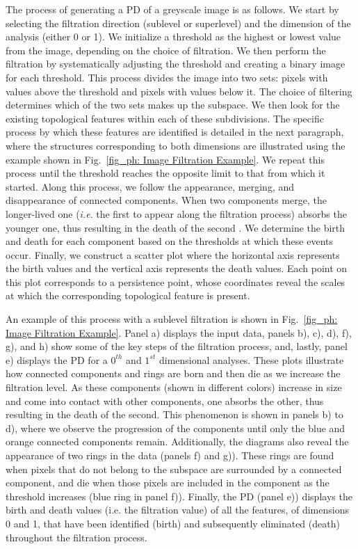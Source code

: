 \documentclass[12pt]{mythesis}
\begin{document}
The process of generating a PD of a greyscale image is as follows. We start by selecting the filtration direction (sublevel or superlevel) and the dimension of the analysis (either 0 or 1). We initialize a threshold as the highest or lowest value from the image, depending on the choice of filtration. We then perform the filtration by systematically adjusting the threshold and creating a binary image for each threshold. This process divides the image into two sets: pixels with values above the threshold and pixels with values below it. The choice of filtering determines which of the two sets makes up the subspace. We then look for the existing topological features within each of these subdivisions. The specific process by which these features are identified is detailed in the next paragraph, where the structures corresponding to both dimensions are illustrated using the example shown in Fig.~\ref{fig_ph: Image Filtration Example}. We repeat this process until the threshold reaches the opposite limit to that from which it started. Along this process, we follow the appearance, merging, and disappearance of connected components. When two components merge, the longer-lived one (\textit{i.e}. the first to appear along the filtration process) absorbs the younger one, thus resulting in the death of the second \citep{eldest}. We determine the birth and death for each component based on the thresholds at which these events occur.  Finally, we construct a scatter plot where the horizontal axis represents the birth values and the vertical axis represents the death values. Each point on this plot corresponds to a persistence point, whose coordinates reveal the scales at which the corresponding topological feature is present.

An example of this process with a sublevel filtration is shown in Fig.~\ref{fig_ph: Image Filtration Example}. Panel a) displays the input data, panels b), c), d), f), g), and h) show some of the key steps of the filtration process, and, lastly, panel e) displays the PD for a $0^{th}$ and $1^{st}$ dimensional analyses. These plots illustrate how connected components and rings are born and then die as we increase the filtration level. As these components (shown in different colors) increase in size and come into contact with other components, one absorbs the other, thus resulting in the death of the second. This phenomenon is shown in panels b) to d), where we observe the progression of the components until only the blue and orange connected components remain. Additionally, the diagrams also reveal the appearance of two rings in the data (panels f) and g)). These rings are found when pixels that do not belong to the subspace are surrounded by a connected component, and die when those pixels are included in the component as the threshold increases (blue ring in panel f)). Finally, the PD (panel e)) displays the birth and death values (i.e. the filtration value) of all the features, of dimensions 0 and 1, that have been identified (birth) and subsequently eliminated (death) throughout the filtration process. 
\end{document}
